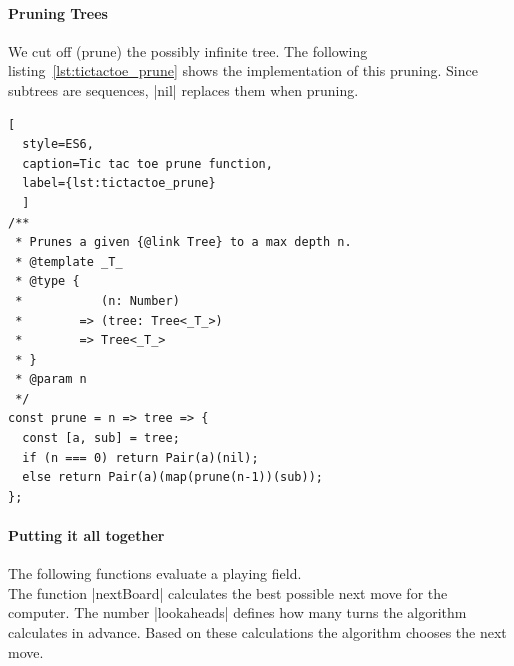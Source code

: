 \paragraph{Pruning Trees} 
We cut off (prune) the possibly infinite tree. The following
listing~\ref{lst:tictactoe_prune} shows the implementation of this pruning.
Since subtrees are sequences, |nil| replaces them when pruning.

\begin{lstlisting}[
  style=ES6, 
  caption=Tic tac toe prune function,
  label={lst:tictactoe_prune}
  ]
/**
 * Prunes a given {@link Tree} to a max depth n.
 * @template _T_
 * @type {
 *           (n: Number)
 *        => (tree: Tree<_T_>)
 *        => Tree<_T_>
 * }
 * @param n
 */
const prune = n => tree => {
  const [a, sub] = tree;
  if (n === 0) return Pair(a)(nil);
  else return Pair(a)(map(prune(n-1))(sub));
};
\end{lstlisting}

\paragraph{Putting it all together}
The following functions evaluate a playing field. \\ 
The function |nextBoard| calculates the best possible next move for the
computer. The number |lookaheads| defines how many turns the algorithm
calculates in advance. Based on these calculations the algorithm chooses the
next move.

